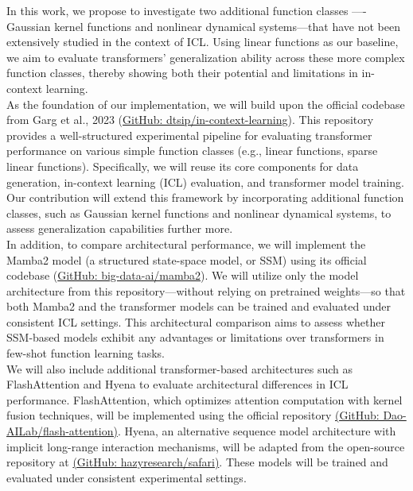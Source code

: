 In this work, we propose to investigate two additional function classes —- Gaussian kernel functions and nonlinear dynamical systems—that have not been extensively studied in the context of ICL. Using linear functions as our baseline, we aim to evaluate transformers’ generalization ability across these more complex function classes, thereby showing both their potential and limitations in in-context learning.
\\
As the foundation of our implementation, we will build upon the official codebase from Garg et al., 2023\cite{garg2023transformerslearnincontextcase} (\href{https://github.com/dtsip/in-context-learning}{GitHub: dtsip/in-context-learning}). This repository provides a well-structured experimental pipeline for evaluating transformer performance on various simple function classes (e.g., linear functions, sparse linear functions). Specifically, we will reuse its core components for data generation, in-context learning (ICL) evaluation, and transformer model training. Our contribution will extend this framework by incorporating additional function classes, such as Gaussian kernel functions and nonlinear dynamical systems, to assess generalization capabilities further more.
\\
In addition, to compare architectural performance, we will implement the Mamba2 model (a structured state-space model, or SSM) using its official codebase (\href{https://github.com/big-data-ai/mamba2}{GitHub: big-data-ai/mamba2}). We will utilize only the model architecture from this repository—without relying on pretrained weights—so that both Mamba2 and the transformer models can be trained and evaluated under consistent ICL settings. This architectural comparison aims to assess whether SSM-based models exhibit any advantages or limitations over transformers in few-shot function learning tasks.
\\
We will also include additional transformer-based architectures such as FlashAttention and Hyena to evaluate architectural differences in ICL performance. FlashAttention, which optimizes attention computation with kernel fusion techniques, will be implemented using the official repository \href{https://github.com/Dao-AILab/flash-attention}{(GitHub: Dao-AILab/flash-attention)}. Hyena, an alternative sequence model architecture with implicit long-range interaction mechanisms, will be adapted from the open-source repository at \href{https://github.com/hazyresearch/safari}{(GitHub: hazyresearch/safari)}. These models will be trained and evaluated under consistent experimental settings.

